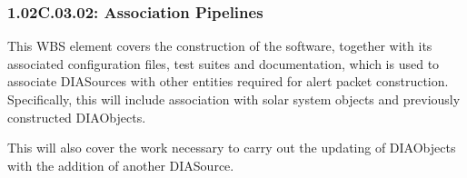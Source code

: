 \subsubsection{1.02C.03.02: Association Pipelines}

This WBS element covers the construction of the software,
together with its associated configuration files, test suites and
documentation, which is used to associate
DIASources with other entities required for alert packet construction.
Specifically, this will include association with solar system objects
and previously constructed DIAObjects.

This will also cover the work necessary to carry out the updating
of DIAObjects with the addition of another DIASource.
